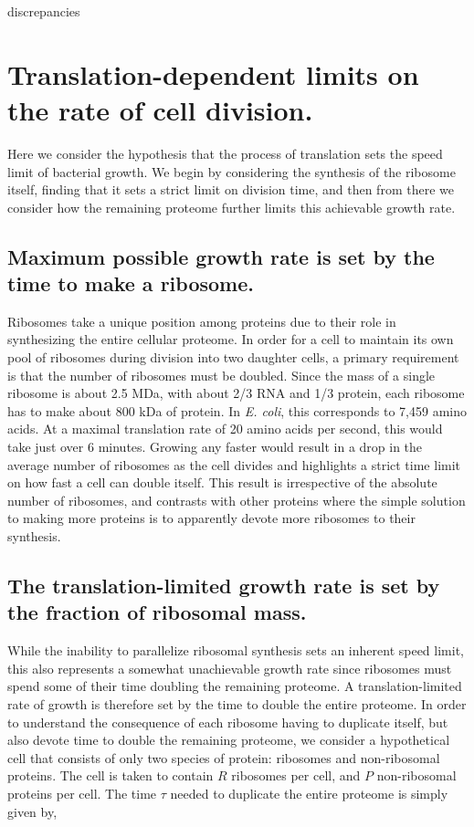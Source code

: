discrepancies \documentclass[11pt, letterpaper]{article}
\begin{document}
%
\newpage
\section{Translation-dependent limits on the rate of cell division.}

Here we consider the hypothesis that the process of translation sets the speed
limit of bacterial growth. We begin by considering the synthesis of the ribosome
itself, finding that it sets a strict limit on division time, and then from there we
consider how the remaining proteome further limits this achievable growth rate.

\subsection{Maximum possible growth rate is set by the time to make a ribosome.}


Ribosomes take a unique position among proteins due to their role in
synthesizing the entire cellular proteome. In order for a cell to maintain its
own pool of ribosomes during division into two daughter cells, a primary
requirement is that the number of ribosomes must be doubled.  Since the  mass of
a single ribosome is about 2.5 MDa, with about 2/3 RNA and 1/3 protein, each
ribosome has to make about 800 kDa of protein. In {\it E. coli},
this corresponds to 7,459 amino acids. At a maximal translation rate of 20 amino
acids per second, this would take just over 6 minutes.  Growing any faster would
result in a drop in the average number of ribosomes as the cell divides and
highlights a strict time limit on how fast a cell can double itself.  This
result is irrespective of the absolute number of ribosomes, and contrasts with
other proteins where the simple solution to making more proteins is to
apparently devote more ribosomes to their synthesis.

\subsection{The translation-limited growth rate is set by the fraction of
ribosomal mass.}

While the inability to parallelize ribosomal synthesis sets an inherent speed
limit, this also represents a somewhat unachievable growth rate since ribosomes must
spend some of their time doubling the remaining proteome. A
translation-limited rate of growth is therefore set by the time to double the
entire proteome. In order to understand the consequence of each ribosome having
to duplicate itself, but also devote time to double the remaining proteome, we
consider a hypothetical cell that consists of only two species of protein:
ribosomes and non-ribosomal proteins. The cell is taken to contain $R$ ribosomes
per cell, and $P$ non-ribosomal proteins per cell. The time $\tau$ needed to
duplicate the entire proteome is simply given by,
\end{document}
